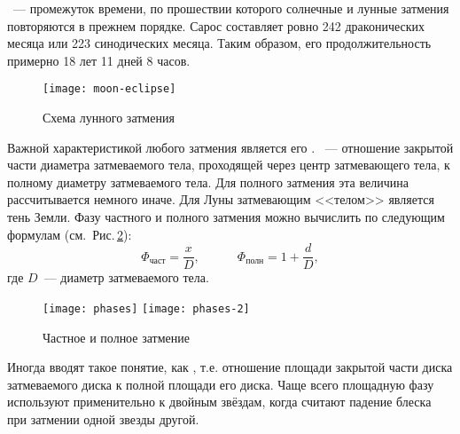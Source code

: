 ~--- промежуток  времени, по прошествии которого солнечные и 
лунные затмения повторяются в прежнем порядке. Сарос составляет ровно 242 драконических месяца или 223 синодических месяца. Таким образом, его продолжительность примерно 18 лет 11 дней 8 часов.

\begin{figure}[h!]
\centering
\texttt{[image: moon-eclipse]}
\caption{Схема лунного затмения}
\label{fig:moon-eclipse-scheme}
\end{figure}

Важной характеристикой любого затмения является его . ~--- отношение закрытой части диаметра затмеваемого тела, проходящей через центр затмевающего тела, к полному диаметру затмеваемого тела. Для полного затмения эта величина рассчитывается немного иначе. Для Луны затмевающим <<телом>> является тень Земли. Фазу частного и полного затмения можно вычислить по следующим формулам (см.~Рис.\,\ref{fig:part-eclipses-scheme}):\begin{equation}
\Phi_{\text{част}} = \frac{x}{D}, \quad \quad \quad \Phi_{\text{полн}} = 1 + \frac{d}{D},
\end{equation}
где $D$~--- диаметр затмеваемого тела.
\begin{figure}[h!]
	\centering
	\texttt{[image: phases]}
	\hspace{1.5cm}
	\texttt{[image: phases-2]}
	\caption{Частное и полное затмение}
	\label{fig:part-eclipses-scheme}
\end{figure}

Иногда вводят такое понятие, как , т.е. отношение площади закрытой части диска затмеваемого диска к полной площади его диска. Чаще всего  площадную фазу используют применительно к двойным звёздам, когда считают падение блеска при затмении одной звезды другой.
